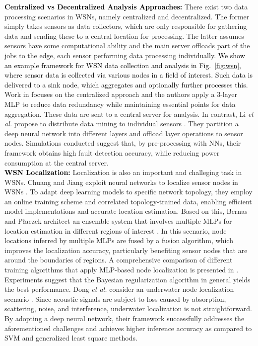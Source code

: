 \documentclass[journal,comsoc,letter]{IEEEtran}
\newcommand{\rev}[1]{\textcolor{black}{#1}}
\begin{document}
\rev{\noindent \textbf{Centralized vs Decentralized Analysis Approaches:}}
There exist two data processing scenarios in WSNs, namely centralized and decentralized. The former simply takes sensors as data collectors, which are only responsible for gathering data and sending these to a central location for processing. The latter assumes sensors have some computational ability and the main server offloads part of the jobs to the edge, each sensor performing data processing individually. 
\rev{We show an example framework for WSN data collection and analysis in Fig.~\ref{fig:wsn}, where sensor data is collected via various nodes in a field of interest. Such data is delivered to a sink node, which aggregates and optionally further processes this.} 
Work in \cite{khorasani2017energy} focuses on the centralized approach and the authors apply a 3-layer MLP to reduce data redundancy while maintaining essential points for data aggregation. These data are sent to a central server for analysis. In contrast, Li \emph{et al.} propose to distribute data mining to individual sensors \cite{li2015distributed}. They partition a deep neural network into different layers and offload layer operations to sensor nodes. Simulations conducted suggest that, by pre-processing with NNs, their framework obtains high fault detection accuracy, while reducing power consumption at the central server. \\

\rev{\noindent \textbf{WSN Localization:}}
Localization is also an important and challeging task in WSNs. Chuang and Jiang exploit neural networks to localize sensor nodes in WSNs \cite{chuang2014effective}. To adapt deep learning models to specific network topology, they employ an online training scheme and correlated topology-trained data, enabling efficient model implementations and accurate location estimation. Based on this, Bernas and P{\l}aczek architect an ensemble system that involves multiple MLPs for location estimation in different regions of interest \cite{bernas2015fully}. In this scenario, node locations inferred by multiple MLPs are fused by a fusion algorithm, which improves the localization accuracy, particularly benefiting sensor nodes that are around the boundaries of regions. A comprehensive comparison of different training algorithms that apply MLP-based node localization is presented in \cite{payal2015analysis}. Experiments suggest that the Bayesian regularization algorithm in general yields the best performance. Dong \emph{et al.} consider an underwater node localization scenario \cite{dong2017range}. Since acoustic signals are subject to loss caused by absorption, scattering, noise, and interference, underwater localization is not straightforward. By adopting a deep neural network, their framework successfully addresses the aforementioned challenges and achieves higher inference accuracy as compared to SVM and generalized least square methods.
\end{document}
